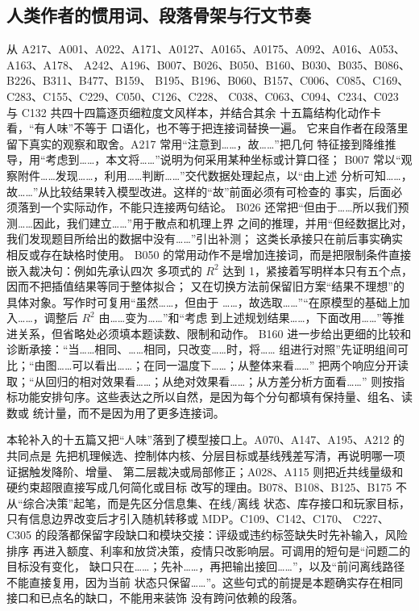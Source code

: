 \subsection{人类作者的惯用词、段落骨架与行文节奏}

从 A217、A001、A022、A171、A0127、A0165、A0175、A092、A016、A053、A163、A178、
A242、A196、B007、B026、B050、B160、B030、B035、B086、B226、B311、B477、B159、
B195、B196、B060、B157、C006、C085、C169、C283、C155、C229、C050、C126、C228、
C038、C063、C094、C234、C023 与 C132 共四十四篇逐页细粒度文风样本，并结合其余
十五篇结构化动作卡看，“有人味”不等于
口语化，也不等于把连接词替换一遍。
它来自作者在段落里留下真实的观察和取舍。A217 常用“注意到……，故……”把几何
特征接到降维推导，用“考虑到……，本文将……”说明为何采用某种坐标或计算口径；
B007 常以“观察附件……发现……，利用……判断……”交代数据处理起点，以“由上述
分析可知……，故……”从比较结果转入模型改进。这样的“故”前面必须有可检查的
事实，后面必须落到一个实际动作，不能只连接两句结论。
B026 还常把“但由于……所以我们预测……因此，我们建立……”用于散点和机理上界
之间的推理，并用“但经数据比对，我们发现题目所给出的数据中没有……”引出补测；
这类长承接只在前后事实确实相反或存在缺格时使用。
B050 的常用动作不是增加连接词，而是把限制条件直接嵌入裁决句：例如先承认四次
多项式的 $R^2$ 达到 1，紧接着写明样本只有五个点，因而不把插值结果等同于整体拟合；
又在切换方法前保留旧方案“结果不理想”的具体对象。写作时可复用“虽然……，但由于
……，故选取……”“在原模型的基础上加入……，调整后 $R^2$ 由……变为……”和“考虑
到上述规划结果……，下面改用……”等推进关系，但省略处必须填本题读数、限制和动作。
B160 进一步给出更细的比较和诊断承接：“当……相同、……相同，只改变……时，将……
组进行对照”先证明组间可比；“由图……可以看出……；在同一温度下……；从整体来看……”
把两个响应分开读取；“从回归的相对效果看……；从绝对效果看……；从方差分析方面看……”
则按指标功能安排句序。这些表达之所以自然，是因为每个分句都填有保持量、组名、读数或
统计量，而不是因为用了更多连接词。

本轮补入的十五篇又把“人味”落到了模型接口上。A070、A147、A195、A212 的共同点是
先把机理候选、控制体内核、分层目标或基线残差写清，再说明哪一项证据触发降阶、增量、
第二层裁决或局部修正；A028、A115 则把近共线量级和硬约束超限直接写成几何简化或目标
改写的理由。B078、B108、B125、B175 不从“综合决策”起笔，而是先区分信息集、在线/离线
状态、库存接口和玩家目标，只有信息边界改变后才引入随机转移或 MDP。C109、C142、C170、
C227、C305 的段落都保留字段缺口和模块交接：评级或违约标签缺失时先补输入，风险排序
再进入额度、利率和放贷决策，疫情只改影响层。可调用的短句是“问题二的目标没有变化，
缺口只在……；先补……，再把输出接回……”，以及“前问离线路径不能直接复用，因为当前
状态只保留……”。这些句式的前提是本题确实存在相同接口和已点名的缺口，不能用来装饰
没有跨问依赖的段落。

